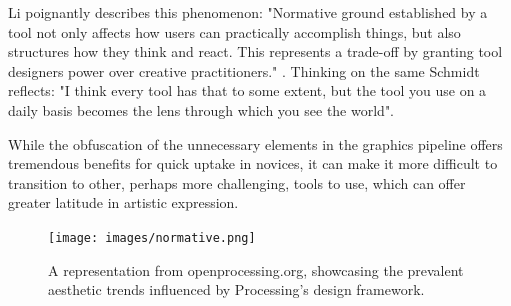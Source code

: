 Li poignantly describes this phenomenon: "Normative ground established by a tool not only affects how users can practically accomplish things, but also structures how they think and react. This represents a trade-off by granting tool designers power over creative practitioners." \parencite[65]{liRethinkingPowerDynamics2023}. Thinking on the same Schmidt reflects:  "I think every tool has that to some extent, but the tool you use on a daily basis becomes the lens through which you see the world".

While the obfuscation of the unnecessary elements in the graphics pipeline offers tremendous benefits for quick uptake in novices, it can make it more difficult to transition to other, perhaps more challenging, tools to use, which can offer greater latitude in artistic expression. 




\begin{figure}
    \centering
    \texttt{[image: images/normative.png]}
    \caption{A representation from openprocessing.org, showcasing the prevalent aesthetic trends influenced by Processing's design framework.}
    \label{fig:normative}
\end{figure}
